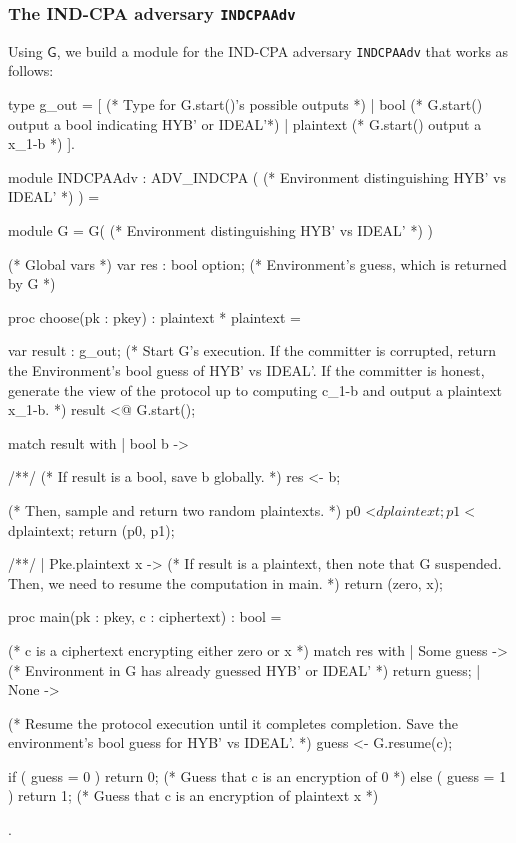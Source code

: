 \documentclass{article}[12pt]
\newcommand{\code}[1]{\texttt{#1}} %
\newcommand{\G}{\mathsf{G}}
\begin{document}
\subsubsection{The IND-CPA adversary \code{INDCPAAdv}}
Using $\G$, we build a module for the IND-CPA adversary \code{INDCPAAdv} that works as follows:

\begin{easycrypt}[label=code:indcpaadv, caption={Module representing an IND-CPA adversary constructed using the game $\G$.}]
type g_out = [		(* Type for G.start()'s possible outputs *)
	| bool			(* G.start() output a bool indicating HYB' or IDEAL'*)
	| plaintext		(* G.start() output a x_{1-b} *)
].

module INDCPAAdv : ADV_INDCPA ( (* Environment distinguishing HYB' vs IDEAL' *) ) = {
	module G = G( (* Environment distinguishing HYB' vs IDEAL' *) )

	(* Global vars *)
	var res : bool option; (* Environment's guess, which is returned by G *)

	proc choose(pk : pkey) : plaintext * plaintext = {
		var result : g_out;
		(* Start G's execution. If the committer is corrupted, return the Environment's bool guess of HYB' vs IDEAL'. If the committer is honest, generate the view of the protocol up to computing c_{1-b} and output a plaintext x_{1-b}. *)
		result <@ G.start();

		match result with
		| bool b -> { /*\label{line:unif_ptxts_start}*/
			(* If result is a bool, save b globally. *)
			res <- b;

			(* Then, sample and return two random plaintexts. *)
			p0 <$ dplaintext;
			p1 <$ dplaintext;
			return (p0, p1);
		} /*\label{line:unif_ptxts_end}*/
		| Pke.plaintext x -> {
			(* If result is a plaintext, then note that G suspended. Then, we need to resume the computation in main. *)
			return (zero, x);
		}
	}

	proc main(pk : pkey, c : ciphertext) : bool = { (* c is a ciphertext encrypting either zero or x *)
		match res with
		| Some guess -> {
			(* Environment in G has already guessed HYB' or IDEAL' *)
			return guess;
		}
		| None -> {
			(* Resume the protocol execution until it completes completion. Save the environment's bool guess for HYB' vs IDEAL'. *)
			guess <- G.resume(c);

			if ( guess = 0 ) {
				return 0;	(* Guess that c is an encryption of 0 *)
			}
			else ( guess = 1 ) {
				return 1;	(* Guess that c is an encryption of plaintext x *)
			}
		}
	}
}.
\end{easycrypt}
\end{document}
